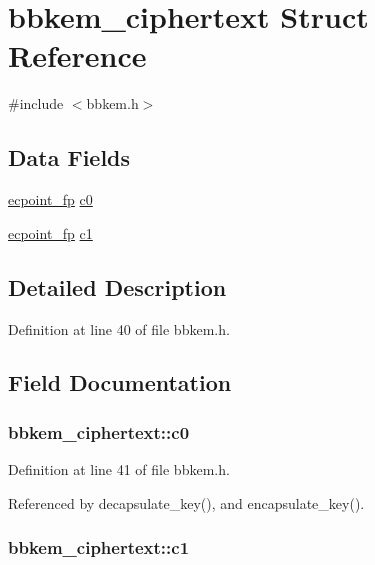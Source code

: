 \hypertarget{structbbkem__ciphertext}{\section{bbkem\-\_\-ciphertext Struct Reference}
\label{structbbkem__ciphertext}
}


{\ttfamily \#include $<$bbkem.\-h$>$}

\subsection*{Data Fields}
\begin{DoxyCompactItemize}
\item 
\hyperlink{structecpoint__fp}{ecpoint\-\_\-fp} \hyperlink{structbbkem__ciphertext_a71db8de327bfa2f1559d6a91a64bb5af}{c0}
\item 
\hyperlink{structecpoint__fp}{ecpoint\-\_\-fp} \hyperlink{structbbkem__ciphertext_aacdf8760108033e11266ee3234a40f9a}{c1}
\end{DoxyCompactItemize}


\subsection{Detailed Description}


Definition at line 40 of file bbkem.\-h.



\subsection{Field Documentation}
\hypertarget{structbbkem__ciphertext_a71db8de327bfa2f1559d6a91a64bb5af}{
\subsubsection[{c0}]{ bbkem\-\_\-ciphertext\-::c0}}\label{structbbkem__ciphertext_a71db8de327bfa2f1559d6a91a64bb5af}


Definition at line 41 of file bbkem.\-h.



Referenced by decapsulate\-\_\-key(), and encapsulate\-\_\-key().

\hypertarget{structbbkem__ciphertext_aacdf8760108033e11266ee3234a40f9a}{
\subsubsection[{c1}]{ bbkem\-\_\-ciphertext\-::c1}}\label{structbbkem__ciphertext_aacdf8760108033e11266ee3234a40f9a}


